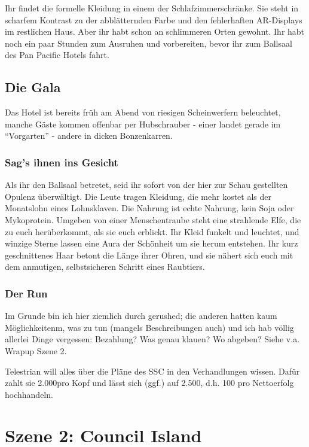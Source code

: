 Ihr findet die formelle Kleidung in einem der Schlafzimmerschränke. Sie steht in scharfem Kontrast zu der abblätternden Farbe und den fehlerhaften AR-Displays im restlichen Haus. Aber ihr habt schon an schlimmeren Orten gewohnt. Ihr habt noch ein paar Stunden zum Ausruhen und vorbereiten, bevor ihr zum Ballsaal des Pan Pacific Hotels fahrt.


\subsection{Die Gala}

Das Hotel ist bereits früh am Abend von riesigen Scheinwerfern beleuchtet, manche Gäste kommen offenbar per Hubschrauber - einer landet gerade im ``Vorgarten'' - andere in dicken Bonzenkarren. 

\subsubsection{Sag's ihnen ins Gesicht}

Als ihr den Ballsaal betretet, seid ihr sofort von der hier zur Schau gestellten Opulenz überwältigt. Die Leute tragen Kleidung, die mehr kostet als der Monatslohn eines Lohnsklaven. Die Nahrung ist echte Nahrung, kein Soja oder Mykoprotein. Umgeben von einer Menschentraube steht eine strahlende Elfe, die zu euch herüberkommt, als sie euch erblickt. Ihr Kleid funkelt und leuchtet, und winzige Sterne lassen eine Aura der Schönheit um sie herum entstehen. Ihr kurz geschnittenes Haar betont die Länge ihrer Ohren, und sie nähert sich euch mit dem anmutigen, selbstsicheren Schritt eines Raubtiers.

\subsubsection{Der Run}

Im Grunde bin ich hier ziemlich durch gerushed; die anderen hatten kaum Möglichkeitenm, was zu tun (mangels Beschreibungen auch) und ich hab völlig allerlei Dinge vergessen: Bezahlung? Was genau klauen? Wo abgeben? Siehe v.a. Wrapup Szene 2.

Telestrian will alles über die Pläne des SSC in den Verhandlungen wissen. Dafür zahlt sie 2.000\nuyen pro Kopf und lässt sich (ggf.) auf 2.500, d.h. 100 pro Nettoerfolg hochhandeln.




\section{Szene 2: Council Island}

